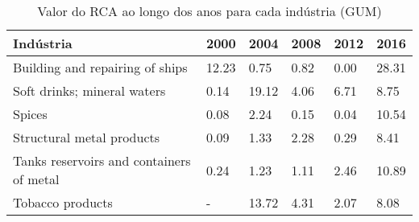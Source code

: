 \begin{table}
\centering
\caption{Valor do RCA ao longo dos anos para cada indústria (GUM)}
\begin{tabular}{p{6cm}p{1.5cm}p{1.5cm}p{1.5cm}p{1.5cm}p{1.5cm}}
\toprule
                               Indústria &  2000 &  2004 & 2008 & 2012 &  2016 \\
\midrule
         Building and repairing of ships & 12.23 &  0.75 & 0.82 & 0.00 & 28.31 \\
             Soft drinks; mineral waters &  0.14 & 19.12 & 4.06 & 6.71 &  8.75 \\
                                  Spices &  0.08 &  2.24 & 0.15 & 0.04 & 10.54 \\
               Structural metal products &  0.09 &  1.33 & 2.28 & 0.29 &  8.41 \\
Tanks reservoirs and containers of metal &  0.24 &  1.23 & 1.11 & 2.46 & 10.89 \\
                        Tobacco products &     - & 13.72 & 4.31 & 2.07 &  8.08 \\
\bottomrule
\end{tabular}
\end{table}
